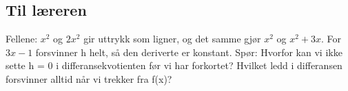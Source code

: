 \documentclass[11pt,a4paper]{article}
\begin{document}
\subsection*{Til læreren}
Fellene: $x^2$ og $2x^2$ gir uttrykk som ligner, og det samme gjør $x^2$ og $x^2 + 3x$. For $3x - 1$ forsvinner h helt, så den deriverte er konstant. Spør: Hvorfor kan vi ikke sette h = 0 i differansekvotienten før vi har forkortet? Hvilket ledd i differansen forsvinner alltid når vi trekker fra f(x)?
\end{document}
